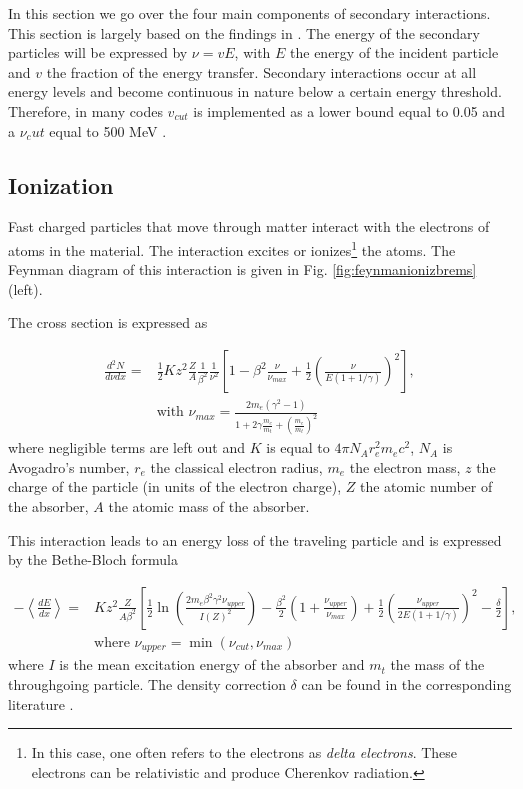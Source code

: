 In this section we go over the four main components of secondary interactions. This section is largely based on the findings in \cite{Chirkin:2004hz}. The energy of the secondary particles will be expressed by $\nu = v E$, with $E$ the energy of the incident particle and $v$ the fraction of the energy transfer. Secondary interactions occur at all energy levels and become continuous in nature below a certain energy threshold. Therefore, in many codes $v_{cut}$ is implemented as a lower bound equal to 0.05 and a $\nu_cut$ equal to 500 MeV \cite{dimaspice}. 

\subsection{Ionization}
Fast charged particles that move through matter interact with the electrons of atoms in the material. The interaction excites or ionizes\footnote{In this case, one often refers to the electrons as \textit{delta electrons}. These electrons can be relativistic and produce Cherenkov radiation.} the atoms. The Feynman diagram of this interaction is given in Fig. \ref{fig:feynmanionizbrems} (left). 

The cross section is expressed as 

\begin{equation}
\begin{split}
\frac{d^2N}{d\nu dx} = &\frac{1}{2} K z^2 \frac{Z}{A} \frac{1}{\beta^2} \frac{1}{
\nu^2} \left[1-\beta^2 \frac{\nu}{\nu_{max}} + \frac{1}{2} \left(\frac{\nu}{E(1+1/\gamma)} \right)^2 \right],\\
&\textrm{with   } \nu_{max} = \frac{2 m_e (\gamma^2 -1)}{1+2\gamma \frac{m_e}{m_t} +\left(\frac{m_e}{m_t}\right)^2}
\end{split}
\end{equation}
where negligible terms are left out and $K$ is equal to $4\pi N_A r_e^2 m_e c^2$, $N_A$ is Avogadro's number, $r_e$ the classical electron radius, $m_e$ the electron mass, $z$ the charge of the particle (in units of the electron charge), $Z$ the atomic number of the absorber, $A$ the atomic mass of the absorber.

This interaction leads to an energy loss of the traveling particle and is expressed by the Bethe-Bloch formula \cite{PDG2018url}

\begin{equation}
\label{eq:ioniz}
\begin{split}
-\left\langle\frac{dE}{dx}\right\rangle = &K z^2 \frac{Z}{A \beta^2} \left[\frac{1}{2} \ln \left(\frac{2 m_e \beta^2 \gamma^2 \nu_{upper}}{I\left(Z\right)^2} \right) -\frac{\beta^2}{2}  \left(1+\frac{\nu_{upper}}{\nu_{max}} \right) + \frac{1}{2} \left( \frac{\nu_{upper}}{2E(1+1/\gamma)}\right)^2 - \frac{\delta}{2}\right], \\ 
&\textrm{where } \nu_{upper} = \min(\nu_{cut},\nu_{max}) 
\end{split}
\end{equation} 
where $I$ is the mean excitation energy of the absorber and $m_t$ the mass of the throughgoing particle. The density correction $\delta$ can be found in the corresponding literature \cite{Chirkin:2004hz}.

